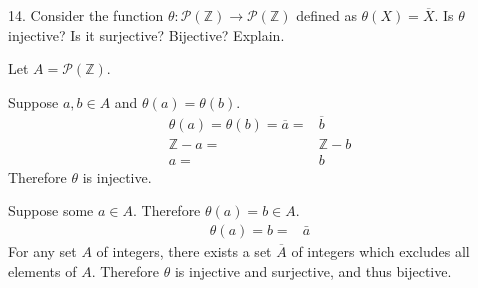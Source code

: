 \documentclass{article}
\begin{document}
\begin{exercise}{}{}
	{14. Consider the function $\theta: \mathscr{P}(\mathbb{Z})
			\rightarrow \mathscr{P}(\mathbb{Z})$ defined as $\theta(X)=\overline{X}$. Is
		$\theta$ injective? Is it surjective? Bijective? Explain.}
	\begin{alist}
		\item Let $A=\mathscr{P}(\mathbb{Z})$.
		\item Suppose $a, b \in A$ and $\theta(a)=\theta(b)$.
		\begin{align*}
			\theta(a)=\theta(b)=\overline{a} = & \overline{b}  \\
			\mathbb{Z} - a =                   & \mathbb{Z} -b \\
			a =                                & b
		\end{align*}
		Therefore $\theta$ is injective.
		\item Suppose some $a\in A$. Therefore $\theta(a)=b\in A$.
		\begin{align*}
			\theta(a)=b= & \bar{a}
		\end{align*}
		For any set $A$ of integers, there exists a set $\overline{A}$ of integers which excludes all
		elements of $A$. Therefore $\theta$ is injective and surjective, and thus
		bijective.
	\end{alist}
\end{exercise}{}{}
\end{document}
